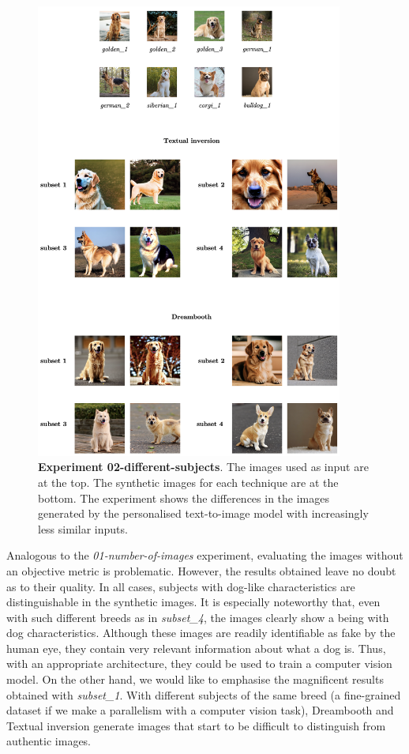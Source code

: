 \begin{figure}
    \centering
    \includegraphics[width=0.90\textwidth]{Pictures/exp2.png} 
    \caption{\textbf{Experiment 02-different-subjects}. The images used as input are at the top. The synthetic images for each technique are at the bottom. The experiment shows the differences in the images generated by the personalised text-to-image model with increasingly less similar inputs.}
    \label{fig:exp2}
\end{figure}

Analogous to the \textit{01-number-of-images} experiment, evaluating the images without an objective metric is problematic. However, the results obtained leave no doubt as to their quality. In all cases, subjects with dog-like characteristics are distinguishable in the synthetic images. It is especially noteworthy that, even with such different breeds as in \textit{subset\_4}, the images clearly show a being with dog characteristics. Although these images are readily identifiable as fake by the human eye, they contain very relevant information about what a dog is. Thus, with an appropriate architecture, they could be used to train a computer vision model. On the other hand, we would like to emphasise the magnificent results obtained with \textit{subset\_1}. With different subjects of the same breed (a fine-grained dataset if we make a parallelism with a computer vision task), Dreambooth and Textual inversion generate images that start to be difficult to distinguish from authentic images.


